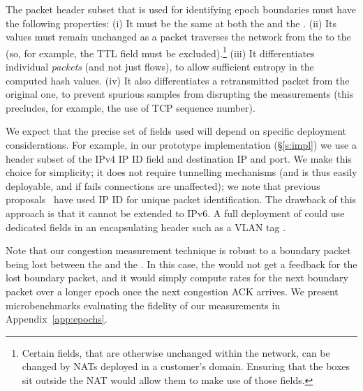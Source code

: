 The packet header subset that is used for identifying epoch boundaries must have the following properties:
(i) It must be the same at both the \inbox and the \outbox.
(ii) Its values must remain unchanged as a packet traverses the network from the \inbox to the \outbox (so, for example, the TTL field must be excluded).\footnote{Certain fields, that are otherwise unchanged within the network, can be changed by NATs deployed in a customer's domain. Ensuring that the \name boxes sit outside the NAT would allow them to make use of those fields.}
(iii) It differentiates individual \emph{packets} (and not just flows), to allow sufficient entropy in the computed hash values.
(iv) It also differentiates a retransmitted packet from the original one, to prevent spurious samples from disrupting the measurements (this precludes, for example, the use of TCP sequence number).

We expect that the precise set of fields used will depend on specific deployment considerations.
For example, in our prototype implementation (\S\ref{s:impl}) we use a header subset of the IPv4 IP ID field and destination IP and port. 
We make this choice for simplicity; it does not require tunnelling mechanisms (and is thus easily deployable, and if \name fails connections are unaffected); we note that previous proposals~\cite{ip-traceback} have used IP ID for unique packet identification. The drawback of this approach is that it cannot be extended to IPv6.
A full deployment  of \name could use dedicated fields in an encapsulating header such as a VLAN tag .

Note that our congestion measurement technique is robust to a boundary packet being lost between the \inbox and the \outbox. In this case, the \inbox would not get a feedback for the lost boundary packet, and it would simply compute rates for the next boundary packet over a longer epoch once the next congestion ACK arrives. We present microbenchmarks evaluating the fidelity of our measurements in Appendix~\ref{app:epochs}.


